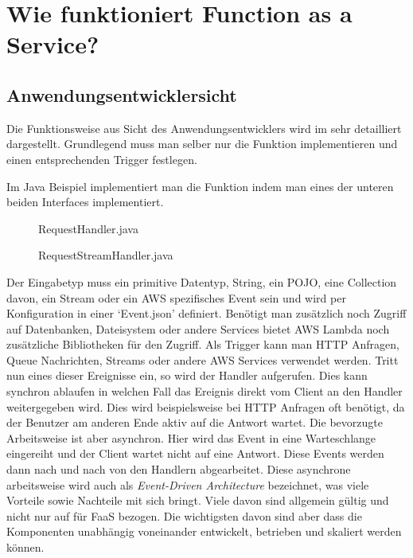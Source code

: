 \documentclass[12pt, a4paper]{article}
\begin{document}
\section{Wie funktioniert Function as a Service?}
\subsection{Anwendungsentwicklersicht}
Die Funktionsweise aus Sicht des Anwendungsentwicklers wird im \cite[Developer Guide von \ac{AWS}]{awsLambda_devGuide} sehr detailliert dargestellt.
Grundlegend muss man selber nur die Funktion implementieren und einen entsprechenden Trigger festlegen.

Im Java Beispiel implementiert man die Funktion indem man eines der unteren beiden Interfaces implementiert.

\begin{figure}[h]
    
    \caption{RequestHandler.java}
\end{figure}

\begin{figure}[h]
    
    \caption{RequestStreamHandler.java}
\end{figure}

Der Eingabetyp muss ein primitive Datentyp, String, ein \ac{POJO}, eine Collection davon, ein Stream oder ein AWS spezifisches Event sein und wird per Konfiguration in einer `Event.json' definiert.
Benötigt man zusätzlich noch Zugriff auf Datenbanken, Dateisystem oder andere Services bietet \ac{AWS} Lambda noch zusätzliche Bibliotheken für den Zugriff.
\newline\newline
Als Trigger kann man HTTP Anfragen, Queue Nachrichten, Streams oder andere \ac{AWS} Services verwendet werden.
Tritt nun eines dieser Ereignisse ein, so wird der Handler aufgerufen.
Dies kann synchron ablaufen in welchen Fall das Ereignis direkt vom Client an den Handler weitergegeben wird.
Dies wird beispielsweise bei HTTP Anfragen oft benötigt, da der Benutzer am anderen Ende aktiv auf die Antwort wartet.
\newline
Die bevorzugte Arbeitsweise ist aber asynchron.
Hier wird das Event in eine Warteschlange eingereiht und der Client wartet nicht auf eine Antwort.
Diese Events werden dann nach und nach von den Handlern abgearbeitet.
Diese asynchrone arbeitsweise wird auch als \emph{Event-Driven Architecture} bezeichnet, was viele Vorteile sowie Nachteile mit sich bringt\cite{awsEventDrivenArchitecture}.
Viele davon sind allgemein gültig und nicht nur auf für \ac{FaaS} bezogen.
Die wichtigsten davon sind aber dass die Komponenten unabhängig voneinander entwickelt, betrieben und skaliert werden können.
\end{document}
